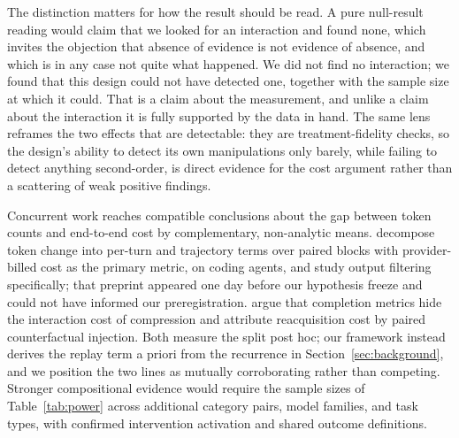 \documentclass{article}
\begin{document}
The distinction matters for how the result should be read. A pure null-result reading would claim that we looked for an interaction and found none, which invites the objection that absence of evidence is not evidence of absence, and which is in any case not quite what happened. We did not find no interaction; we found that this design could not have detected one, together with the sample size at which it could. That is a claim about the measurement, and unlike a claim about the interaction it is fully supported by the data in hand. The same lens reframes the two effects that are detectable: they are treatment-fidelity checks, so the design's ability to detect its own manipulations only barely, while failing to detect anything second-order, is direct evidence for the cost argument rather than a scattering of weak positive findings.

Concurrent work reaches compatible conclusions about the gap between token counts and end-to-end cost by complementary, non-analytic means. \citet{tokennotcost2026} decompose token change into per-turn and trajectory terms over paired blocks with provider-billed cost as the primary metric, on coding agents, and study output filtering specifically; that preprint appeared one day before our hypothesis freeze and could not have informed our preregistration. \citet{compressioncost2026} argue that completion metrics hide the interaction cost of compression and attribute reacquisition cost by paired counterfactual injection. Both measure the split post hoc; our framework instead derives the replay term a priori from the recurrence in Section~\ref{sec:background}, and we position the two lines as mutually corroborating rather than competing. Stronger compositional evidence would require the sample sizes of Table~\ref{tab:power} across additional category pairs, model families, and task types, with confirmed intervention activation and shared outcome definitions.
\end{document}
